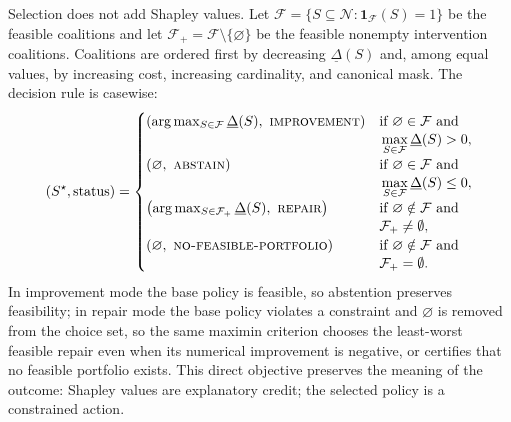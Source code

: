 \documentclass[review]{elsarticle}
\theoremstyle{plain}
\theoremstyle{definition}
\theoremstyle{remark}
\newcommand{\Players}{\mathcal{N}}
\begin{document}
Selection does not add Shapley values. Let $\mathcal{F}=\{S\subseteq\Players:\mathbf{1}_{\mathcal F}(S)=1\}$ be the feasible coalitions and let $\mathcal F_+=\mathcal F\setminus\{\varnothing\}$ be the feasible nonempty intervention coalitions. Coalitions are ordered first by decreasing $\underline\Delta(S)$ and, among equal values, by increasing cost, increasing cardinality, and canonical mask. The decision rule is casewise:
\begin{equation}
 (S^\star,\mathrm{status})=
 \begin{cases}
 \left(\arg\max_{S\in\mathcal F}\underline\Delta(S),\ \textsc{improvement}\right)
   & \begin{aligned}[t]&\text{if }\varnothing\in\mathcal F\text{ and}\\[-2pt]
     &\max_{S\in\mathcal F}\underline\Delta(S)>0,\end{aligned}\\[4pt]
 \left(\varnothing,\ \textsc{abstain}\right)
   & \begin{aligned}[t]&\text{if }\varnothing\in\mathcal F\text{ and}\\[-2pt]
     &\max_{S\in\mathcal F}\underline\Delta(S)\leq0,\end{aligned}\\[4pt]
 \left(\arg\max_{S\in\mathcal F_+}\underline\Delta(S),\ \textsc{repair}\right)
   & \begin{aligned}[t]&\text{if }\varnothing\notin\mathcal F\text{ and}\\[-2pt]
     &\mathcal F_+\neq\emptyset,\end{aligned}\\[4pt]
 \left(\varnothing,\ \textsc{no-feasible-portfolio}\right)
   & \begin{aligned}[t]&\text{if }\varnothing\notin\mathcal F\text{ and}\\[-2pt]
     &\mathcal F_+=\emptyset.\end{aligned}
 \end{cases}
\label{eq:improve}
\end{equation}
In improvement mode the base policy is feasible, so abstention preserves feasibility; in repair mode the base policy violates a constraint and $\varnothing$ is removed from the choice set, so the same maximin criterion chooses the least-worst feasible repair even when its numerical improvement is negative, or certifies that no feasible portfolio exists. This direct objective preserves the meaning of the outcome: Shapley values are explanatory credit; the selected policy is a constrained action.
\end{document}
